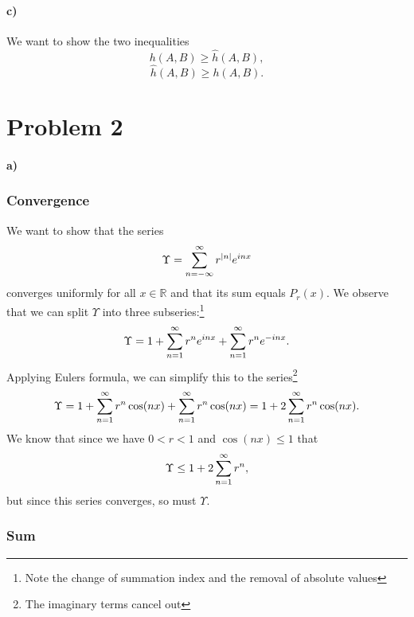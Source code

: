 \documentclass[a4paper]{article}
\begin{document}
\paragraph{c)}
We want to show the two inequalities
\begin{equation}
  h(A, B) \geq \hat{h}(A, B), 
\end{equation}
\begin{equation}
  \hat{h}(A, B) \geq h(A, B).
\end{equation}

\section*{Problem 2}
\paragraph{a)}
\subsubsection*{Convergence}
We want to show that the series
\begin{equation}
  \notag
  \Upsilon = \sum_{n = - \infty}^{\infty}r^{|n|}e^{inx}
\end{equation}
converges uniformly for all $x \in \mathbb{R}$ and that its sum equals $P_r(x)$. 
We observe that we can split $\Upsilon$ into three subseries:\footnote{Note the change of summation index and the removal of absolute values}
\begin{equation}
  \notag
  \Upsilon = 1 + \sum_{n=1}^{\infty}r^{n}e^{inx} + \sum_{n=1}^{\infty}r^{n}e^{-inx}.
\end{equation}
Applying Eulers formula, we can simplify this to the series\footnote{The imaginary terms cancel out}
\begin{equation}
  \notag
  \Upsilon = 1 + \sum_{n=1}^{\infty}r^n\cos(nx) + \sum_{n=1}^{\infty}r^n\cos(nx) = 1 + 2 \sum_{n=1}^{\infty}r^n\cos(nx).
\end{equation}
We know that since we have $0 < r < 1$ and $\cos(nx) \leq 1$ that
\begin{equation}
  \notag
  \Upsilon \leq 1 + 2\sum_{n=1}^{\infty}r^n, 
\end{equation}
but since this series converges, so must $\Upsilon$. 

\subsubsection*{Sum}
\end{document}
